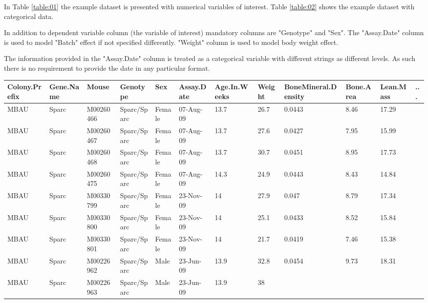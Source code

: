 \documentclass[12pt,a4paper]{article}
\begin{document}
In Table \ref{table:01} the example dataset is presented with numerical variables of interest. Table \ref{table:02} shows the example dataset with categorical data. 

In addition to dependent variable column (the variable of interest) mandatory columns are "Genotype" and "Sex". The "Assay.Date" column is used to model "Batch" effect if not specified differently. "Weight" column is used to model body weight effect.

The information provided in the "Assay.Date" column is treated as a categorical variable with different strings as different levels.  As such there is no requirement to provide the date in any particular format.

\begin{table}
 \begin{tabular}{| p{13mm} | p{13mm} | l | l | l | p{19mm}| p{12mm} | l | p{13mm} | p{12mm} | p{12mm} | l |}
  \hline
Colony.\newline Prefix&Gene.\newline Name&Mouse&\textbf{Genotype}&\textbf{Sex}&\textbf{Assay.\newline Date}&Age.In.\newline Weeks&\textbf{Weight}&Bone\newline Mineral.\newline Density&Bone.\newline Area&Lean.\newline Mass& ... \\\hline
MBAU&Sparc&M00260466&Sparc/Sparc&Female&07-Aug-09&13.7&26.7&0.0443&8.46&17.29&\\
MBAU&Sparc&M00260467&Sparc/Sparc&Female&07-Aug-09&13.7&27.6&0.0427&7.95&15.99&\\
MBAU&Sparc&M00260468&Sparc/Sparc&Female&07-Aug-09&13.7&30.7&0.0451&8.95&17.73&\\
MBAU&Sparc&M00260475&Sparc/Sparc&Female&07-Aug-09&14.3&24.9&0.0443&8.43&14.84&\\
MBAU&Sparc&M00330799&Sparc/Sparc&Female&23-Nov-09&14&27.9&0.047&8.79&17.34&\\
MBAU&Sparc&M00330800&Sparc/Sparc&Female&23-Nov-09&14&25.1&0.0433&8.52&15.84&\\
MBAU&Sparc&M00330801&Sparc/Sparc&Female&23-Nov-09&14&21.7&0.0419&7.46&15.38&\\
MBAU&Sparc&M00226962&Sparc/Sparc&Male&23-Jun-09&13.9&32.8&0.0454&9.73&18.31&\\
MBAU&Sparc&M00226963&Sparc/Sparc&Male&23-Jun-09&13.9&38&&&&\\

\end{tabular}
\end{table}
\end{document}
